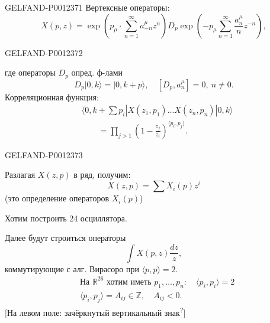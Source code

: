 \begin{GelfandAdjacentEvidence}{GELFAND-P001237}{1}
Вертексные операторы:
\begin{equation*}
X(p,z)=\exp\left(p_\mu\cdot\sum_{n=1}^{\infty}a_{-n}^\mu z^n\right)D_p
\exp\left(-p_\mu\sum_{n=1}^{\infty}\frac{a_n^\mu}{n}z^{-n}\right),
\tag{6}
\end{equation*}
\end{GelfandAdjacentEvidence}
\begin{GelfandAdjacentEvidence}{GELFAND-P001237}{2}


где операторы $D_p$ опред. ф-лами
\begin{equation*}
D_p|0,k\rangle=|0,k+p\rangle,\quad [D_p,a_n^\mu]=0,\ n\ne0.
\tag{7}
\end{equation*}
Корреляционная функция:
\begin{equation*}
\begin{aligned}
&\langle0,k+\textstyle\sum p_i|X(z_1,p_1)\ldots X(z_n,p_n)|0,k\rangle\\
&\qquad=\prod_{j>1}\left(1-\frac{z_j}{z_i}\right)^{\langle p_i,p_j\rangle}.
\end{aligned}
\tag{8}
\end{equation*}
\end{GelfandAdjacentEvidence}
\begin{GelfandAdjacentEvidence}{GELFAND-P001237}{3}


Разлагая $X(z,p)$ в ряд, получим:
\begin{equation*}
X(z,p)=\sum X_i(p)z^i
\tag{9}
\end{equation*}
(это определение операторов $X_i(p)$)

Хотим построить 24 осциллятора.

Далее будут строиться операторы
\begin{equation*}
\int X(p,z)\frac{dz}{z},
\tag{10}
\end{equation*}
коммутирующие с алг. Вирасоро при $\langle p,p\rangle=2$.
\begin{equation*}
\begin{aligned}
&\text{На }\mathbb R^{26}\text{ хотим иметь }p_1,\ldots,p_n:\quad\langle p_i,p_i\rangle=2\\
&\langle p_i,p_j\rangle=A_{ij}\in\mathbb Z,\quad A_{ij}<0.
\end{aligned}
\tag{11}
\end{equation*}
[На левом поле: зачёркнутый вертикальный знак\textsuperscript{?}]
\end{GelfandAdjacentEvidence}
